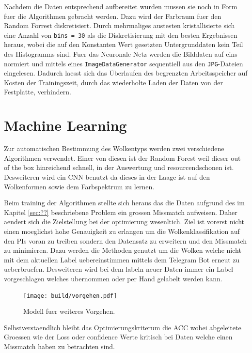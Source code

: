 Nachdem die Daten entsprechend aufbereitet wurden mussen sie noch in Form fuer
die Algorithmen gebracht werden. 
Dazu wird der Farbraum fuer den Random Forrest diskretisiert.
Durch mehrmaliges austesten kristallisierte sich eine Anzahl von 
\texttt{bins = 30} als die Diskretisierung mit den besten Ergebnissen heraus,
wobei die auf den Konstanten Wert gesetzten Untergrunddaten kein Teil des
Histogramms sind.
Fuer das Neuronale Netz werden die Bilddaten auf eins normiert und mittels 
eines \texttt{ImageDataGenerator} sequentiell aus den \texttt{JPG}-Dateien 
eingelesen. 
Dadurch laesst sich das Überlaufen des begrenzten Arbeitsspeicher auf Kosten 
der Trainingszeit, durch das wiederholte Laden der Daten von der Festplatte,
verhindern.


\section{Machine Learning}

Zur automatischen Bestimmung des Wolkentyps werden zwei verschiedene Algorithmen
verwendet. 
Einer von diesen ist der Random Forest weil dieser out of the box hinreichend schnell,
in der Auswertung und resourcendschonen ist.
Desweiteren wird ein CNN benutzt da dieses in der Laage ist auf den Wolkenformen
sowie dem Farbspektrum zu lernen. 

Beim training der Algorithmen stellte sich heraus das die Daten aufgrund des im
Kapitel \ref{sec:??} beschriebene Problem ein grossen Missmatch aufweisen. 
Daher aendert sich die Zielstellung bei der optimierung wesenltich.
Ziel ist vorerst nicht einen moeglichst hohe Genauigkeit zu erlangen um die
Wolkenklassifikation auf den PIs voran zu treiben sondern den Datensatz zu
erweitern und den Missmatch zu minimieren.
Dazu werden die Methoden genutzt um die Wolken welche nicht mit dem aktuellen
Label uebereinstimmen mittels dem Telegram Bot erneut zu ueberbruefen.
Desweiteren wird bei dem labeln neuer Daten immer ein Label vorgeschlagen
welches ubernommen oder per Hand gelabelt werden kann.
\begin{figure}
		\centering
		\texttt{[image: build/vorgehen.pdf]}
		\caption{Modell fuer weiteres Vorgehen.}
		\label{fig:}
\end{figure}

Selbstverstaendlich bleibt das Optimierungskriterum die ACC wobei abgeleitete
Groessen wie der Loss oder confidence Werte kritisch bei Daten welche einen
Missmatch haben zu betrachten sind.

